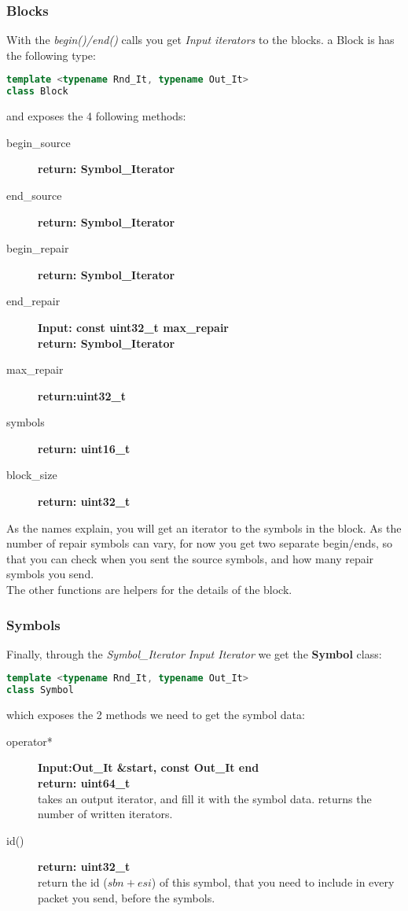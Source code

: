 \documentclass[11pt,a4paper]{refart}
\begin{document}
\subsubsection{Blocks}
With the \textit{begin()/end()} calls you get \textit{Input iterators} to the blocks. a Block is has the following type:
\begin{lstlisting}[language=C++]
template <typename Rnd_It, typename Out_It>
class Block
\end{lstlisting}

and exposes the 4 following methods:
\begin{description}
\item[begin\_source]\textbf{return: Symbol\_Iterator}
\item[end\_source]\textbf{return: Symbol\_Iterator}
\item[begin\_repair]\textbf{return: Symbol\_Iterator}
\item[end\_repair]\textbf{Input: const uint32\_t max\_repair}\\
\textbf{return: Symbol\_Iterator}
\item[max\_repair]\textbf{return:uint32\_t}
\item[symbols]\textbf{return: uint16\_t}
\item[block\_size]\textbf{return: uint32\_t}
\end{description}

As the names explain, you will get an iterator to the symbols in the block. As the number of repair symbols can vary, for now you get two separate begin/ends,
so that you can check when you sent the source symbols, and how many repair symbols you send.\\
The other functions are helpers for the details of the block.


\subsubsection{Symbols}
Finally, through the \textit{Symbol\_Iterator} \textit{Input Iterator} we get the \textbf{Symbol} class:
\begin{lstlisting}[language=C++]
template <typename Rnd_It, typename Out_It>
class Symbol
\end{lstlisting}

which exposes the 2 methods we need to get the symbol data:

\begin{description}
\item[operator*]\textbf{Input:Out\_It \&start, const Out\_It end}\\
\textbf{return: uint64\_t}\\
takes an output iterator, and fill it with the symbol data. returns the number of written iterators.
\item[id()]\textbf{return: uint32\_t}\\
return the id (\textit{$sbn + esi$}) of this symbol, that you need to include in every packet you send, before the symbols.
\end{description}
\end{document}
